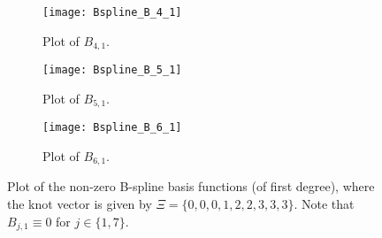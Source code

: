 \begin{figure}
        \begin{subfigure}{0.33\textwidth}
       		\centering
			\texttt{[image: Bspline\_B\_4\_1]}
            \caption{Plot of $B_{4,1}$.}
        \end{subfigure}
		\par\bigskip	
		\par\bigskip	
        \begin{subfigure}{0.33\textwidth}
       		\centering
			\texttt{[image: Bspline\_B\_5\_1]}
            \caption{Plot of $B_{5,1}$.}
        \end{subfigure}%
        \hspace*{0.005\textwidth}%
        \begin{subfigure}{0.33\textwidth}
       		\centering
			\texttt{[image: Bspline\_B\_6\_1]}
            \caption{Plot of $B_{6,1}$.}
        \end{subfigure}
        \caption[Plot of B-splines with $\check{p}=1$]{Plot of the non-zero B-spline basis functions (of first degree), where the knot vector is given by $\Xi = \{0, 0, 0, 1, 2, 2, 3, 3, 3\}$. Note that $B_{j,1}\equiv 0$ for $j\in\{1,7\}$.}		
        \label{Fig:Bsplines_p1} 
\end{figure}
